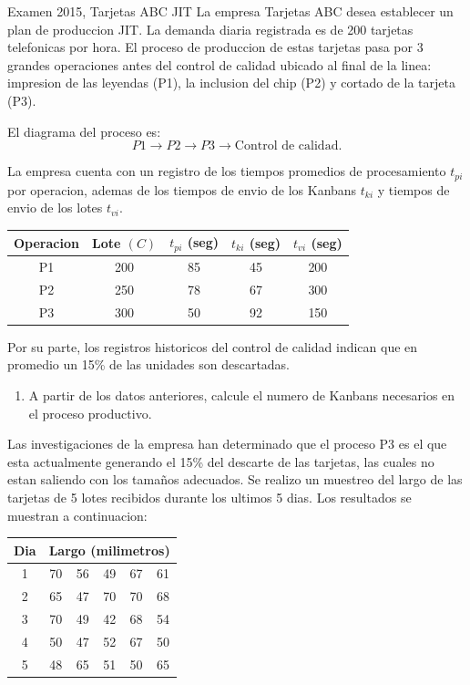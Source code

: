 \begin{enunciado}{Examen 2015, Tarjetas ABC JIT}
La empresa Tarjetas ABC desea establecer un plan de produccion JIT. La demanda diaria registrada es de 200 tarjetas telefonicas por hora. El proceso de produccion de estas tarjetas pasa por 3 grandes operaciones antes del control de calidad ubicado al final de la linea: impresion de las leyendas (P1), la inclusion del chip (P2) y cortado de la tarjeta (P3).

El diagrama del proceso es:
\[
  P1\rightarrow P2\rightarrow P3\rightarrow \text{Control de calidad}.
\]

La empresa cuenta con un registro de los tiempos promedios de procesamiento $t_{pi}$ por operacion, ademas de los tiempos de envio de los Kanbans $t_{ki}$ y tiempos de envio de los lotes $t_{vi}$.

\begin{center}
\begin{tabular}{c|cccc}
\toprule
Operacion & Lote $(C)$ & $t_{pi}$ (seg) & $t_{ki}$ (seg) & $t_{vi}$ (seg)\\
\midrule
P1 & 200 & 85 & 45 & 200\\
P2 & 250 & 78 & 67 & 300\\
P3 & 300 & 50 & 92 & 150\\
\bottomrule
\end{tabular}
\end{center}

Por su parte, los registros historicos del control de calidad indican que en promedio un 15\% de las unidades son descartadas.

\begin{enumerate}[label=\alph*)]
  \item A partir de los datos anteriores, calcule el numero de Kanbans necesarios en el proceso productivo.
\end{enumerate}

Las investigaciones de la empresa han determinado que el proceso P3 es el que esta actualmente generando el 15\% del descarte de las tarjetas, las cuales no estan saliendo con los tamaños adecuados. Se realizo un muestreo del largo de las tarjetas de 5 lotes recibidos durante los ultimos 5 dias. Los resultados se muestran a continuacion:

\begin{center}
\begin{tabular}{c|ccccc}
\toprule
Dia & \multicolumn{5}{c}{Largo (milimetros)}\\
\midrule
1 & 70 & 56 & 49 & 67 & 61\\
2 & 65 & 47 & 70 & 70 & 68\\
3 & 70 & 49 & 42 & 68 & 54\\
4 & 50 & 47 & 52 & 67 & 50\\
5 & 48 & 65 & 51 & 50 & 65\\
\bottomrule
\end{tabular}
\end{center}


\end{enunciado}
